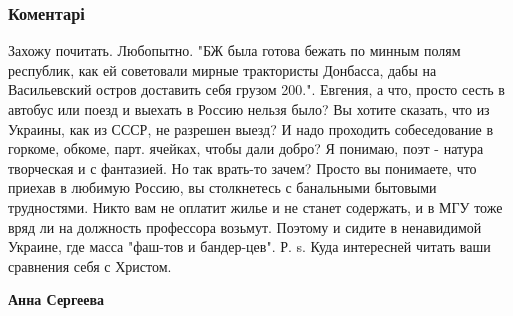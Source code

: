  
 
 
 
 
\subsubsection{Коментарі}
\label{sec:10_11_2021.fb.bilchenko_evgenia.2.moj_piter_2021.cmt}

\begin{itemize} %

Захожу почитать. Любопытно. "БЖ была готова бежать по минным полям республик,
как ей советовали мирные трактористы Донбасса, дабы на Васильевский остров
доставить себя грузом 200.". Евгения, а что, просто сесть в автобус или поезд и
выехать в Россию нельзя было? Вы хотите сказать, что из Украины, как из СССР,
не разрешен выезд? И надо проходить собеседование в горкоме, обкоме,
парт. ячейках, чтобы дали добро? Я понимаю, поэт - натура творческая и с
фантазией. Но так врать-то зачем? Просто вы понимаете, что приехав в любимую
Россию, вы столкнетесь с банальными бытовыми трудностями. Никто вам не оплатит
жилье и не станет содержать, и в МГУ тоже вряд ли на должность профессора
возьмут. Поэтому и сидите в ненавидимой Украине, где масса "фаш-тов и
бандер-цев". Р. s. Куда интересней читать ваши сравнения себя с Христом.

\begin{itemize} %
\textbf{Анна Сергеева} 


\end{itemize}
\end{itemize}
